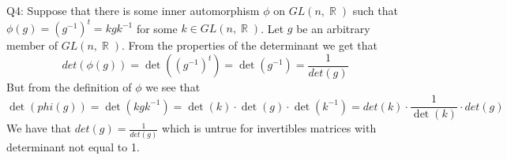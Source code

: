 \documentclass[letterpaper]{article}
\DeclareMathOperator{\R}{\mathbb{R}}
\begin{document}
\noindent
Q4: Suppose that there is some inner automorphism $\phi $ on $GL(n , \R)$ such that $\phi(g) = (g^{-1})^t  = kgk^{-1}$ for some $k \in GL(n,\R)$. Let $g$ be an arbitrary member of $GL(n , \R)$. From the properties of the determinant we get that $$det(\phi(g)) = \det((g^{-1})^{t}) = \det(g^{-1}) = \frac{1}{det(g)}$$
But from the definition of $\phi$ we see that $$\det(phi(g)) = \det(kgk^{-1}) = \det(k)\cdot \det(g) \cdot \det(k^{-1}) = det(k)\cdot \frac{1}{\det(k)}\cdot det(g)$$
We have that $det(g) = \frac{1}{det(g)}$ which is untrue for invertibles matrices with determinant not equal to 1. 
\end{document}
